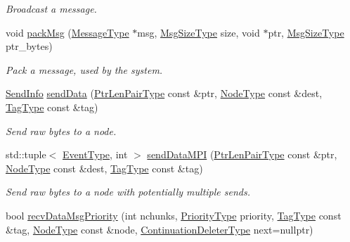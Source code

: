 \begin{DoxyCompactItemize}
\begin{DoxyCompactList}\small\item\em Broadcast a message. \end{DoxyCompactList}\item 
void \hyperlink{structvt_1_1messaging_1_1_active_messenger_a9799bd2681540170faa04b424d3c849e}{pack\+Msg} (\hyperlink{structvt_1_1messaging_1_1_active_messenger_a720a2b1e7462d414b2a51d9fe005eca9}{Message\+Type} $\ast$msg, \hyperlink{namespacevt_a408e86a8c7c89309b52907dc5a513924}{Msg\+Size\+Type} size, void $\ast$ptr, \hyperlink{namespacevt_a408e86a8c7c89309b52907dc5a513924}{Msg\+Size\+Type} ptr\+\_\+bytes)
\begin{DoxyCompactList}\small\item\em Pack a message, used by the system. \end{DoxyCompactList}\item 
\hyperlink{structvt_1_1messaging_1_1_send_info}{Send\+Info} \hyperlink{structvt_1_1messaging_1_1_active_messenger_a98c8e157b97812c677debc8a25ec392d}{send\+Data} (\hyperlink{namespacevt_a97f320a1d3b9b4035e591671cd7d10f0}{Ptr\+Len\+Pair\+Type} const \&ptr, \hyperlink{namespacevt_a866da9d0efc19c0a1ce79e9e492f47e2}{Node\+Type} const \&dest, \hyperlink{namespacevt_a84ab281dae04a52a4b243d6bf62d0e52}{Tag\+Type} const \&tag)
\begin{DoxyCompactList}\small\item\em Send raw bytes to a node. \end{DoxyCompactList}\item 
std\+::tuple$<$ \hyperlink{namespacevt_a009267401def7ae8bf201892222d060f}{Event\+Type}, int $>$ \hyperlink{structvt_1_1messaging_1_1_active_messenger_adb7981ed13c847b01294d240b5c333cb}{send\+Data\+M\+PI} (\hyperlink{namespacevt_a97f320a1d3b9b4035e591671cd7d10f0}{Ptr\+Len\+Pair\+Type} const \&ptr, \hyperlink{namespacevt_a866da9d0efc19c0a1ce79e9e492f47e2}{Node\+Type} const \&dest, \hyperlink{namespacevt_a84ab281dae04a52a4b243d6bf62d0e52}{Tag\+Type} const \&tag)
\begin{DoxyCompactList}\small\item\em Send raw bytes to a node with potentially multiple sends. \end{DoxyCompactList}\item 
bool \hyperlink{structvt_1_1messaging_1_1_active_messenger_afd1df9e2ef65cbce28b3785a17c96348}{recv\+Data\+Msg\+Priority} (int nchunks, \hyperlink{namespacevt_a86bff9f556eb761b27fc8600d006ac04}{Priority\+Type} priority, \hyperlink{namespacevt_a84ab281dae04a52a4b243d6bf62d0e52}{Tag\+Type} const \&tag, \hyperlink{namespacevt_a866da9d0efc19c0a1ce79e9e492f47e2}{Node\+Type} const \&node, \hyperlink{namespacevt_a6de3bd201e2a040be9362d9d24d1e446}{Continuation\+Deleter\+Type} next=nullptr)

\end{DoxyCompactItemize}
